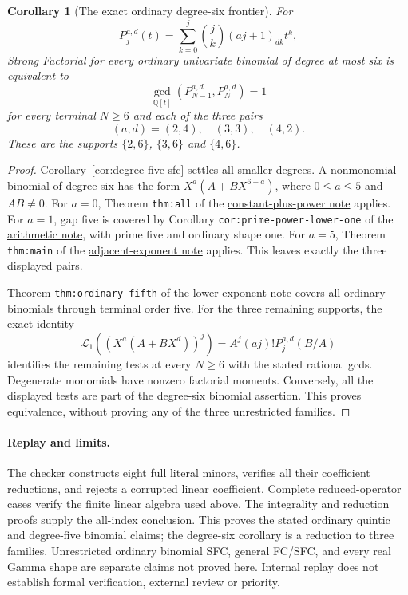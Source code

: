 \documentclass[11pt]{article}
\newtheorem{corollary}{Corollary}
\begin{document}
\begin{corollary}[The exact ordinary degree-six frontier]
\label{cor:degree-six-frontier}
For
\[
 P^{a,d}_j(t)=\sum_{k=0}^j\binom jk(aj+1)_{dk}t^k,
\]
Strong Factorial for every ordinary univariate binomial of degree
at most six is equivalent to
\[
 \gcd_{\mathbb Q[t]}(P^{a,d}_{N-1},P^{a,d}_N)=1
\]
for every terminal $N\ge6$ and each of the three pairs
\[
 (a,d)=(2,4),\quad(3,3),\quad(4,2).
\]
These are the supports $\{2,6\}$, $\{3,6\}$ and $\{4,6\}$.
\end{corollary}
\begin{proof}
Corollary~\ref{cor:degree-five-sfc} settles all smaller degrees.
A nonmonomial binomial of degree six has the form
$X^a(A+BX^{6-a})$, where $0\le a\le5$ and $AB\ne0$.
For $a=0$, Theorem \texttt{thm:all} of the
\href{ALL_UNIVARIATE_TWO_TERM_SFC.tex}{constant-plus-power note}
applies. For $a=1$, gap five is covered by Corollary
\texttt{cor:prime-power-}\allowbreak\texttt{lower-one} of the
\href{ARITHMETIC_FRONTIER_TERMINAL_ORDERS.tex}{arithmetic note},
with prime five and ordinary shape one.
For $a=5$, Theorem \texttt{thm:main} of the
\href{UNIFORM_PADE_PARABOLA_SFC.tex}{adjacent-exponent note}
applies. This leaves exactly the three displayed pairs.

Theorem \texttt{thm:ordinary-fifth} of the
\href{lower_exponent_initial_and_boundary.tex}{lower-exponent note}
covers all ordinary binomials through terminal order five.
For the three remaining supports, the exact identity
\[
 \mathcal L_1((X^a(A+BX^d))^j)
       =A^j(aj)!P^{a,d}_j(B/A)
\]
identifies the remaining tests at every $N\ge6$ with the stated
rational gcds. Degenerate monomials have nonzero factorial moments.
Conversely, all the displayed tests are part of the degree-six
binomial assertion. This proves equivalence, without proving
any of the three unrestricted families.
\end{proof}

\paragraph{Replay and limits.}
The checker constructs eight full literal minors, verifies all
their coefficient reductions, and rejects a corrupted linear
coefficient. Complete reduced-operator cases verify the finite
linear algebra used above. The integrality and reduction proofs
supply the all-index conclusion.
This proves the stated ordinary quintic and degree-five binomial
claims; the degree-six corollary is a reduction to three families.
Unrestricted ordinary binomial SFC, general FC/SFC, and every real
Gamma shape are separate claims not proved here.
Internal replay does not establish formal verification, external
review or priority.
\end{document}
